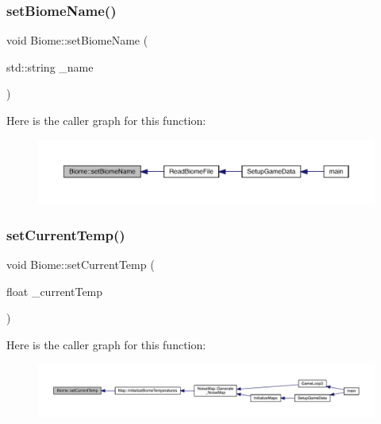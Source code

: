 \mbox{\label{class_biome_a4b702cd936eb35364493be9e3e3c4166}} 
\subsubsection{\texorpdfstring{set\+Biome\+Name()}{setBiomeName()}}
{\footnotesize\ttfamily void Biome\+::set\+Biome\+Name (\begin{DoxyParamCaption}\item[{std\+::string}]{\+\_\+name }\end{DoxyParamCaption})}

Here is the caller graph for this function\+:
\nopagebreak
\begin{figure}[H]
\begin{center}
\leavevmode
\includegraphics[width=350pt]{d6/dd0/class_biome_a4b702cd936eb35364493be9e3e3c4166_icgraph}
\end{center}
\end{figure}
\mbox{\label{class_biome_a73164a278cfd1c3c6cf52a6b006034e0}} 
\subsubsection{\texorpdfstring{set\+Current\+Temp()}{setCurrentTemp()}}
{\footnotesize\ttfamily void Biome\+::set\+Current\+Temp (\begin{DoxyParamCaption}\item[{float}]{\+\_\+current\+Temp }\end{DoxyParamCaption})}

Here is the caller graph for this function\+:
\nopagebreak
\begin{figure}[H]
\begin{center}
\leavevmode
\includegraphics[width=350pt]{d6/dd0/class_biome_a73164a278cfd1c3c6cf52a6b006034e0_icgraph}
\end{center}
\end{figure}
\mbox{\label{class_biome_acc568302ef1e66d443d2e43d94b36a10}} 
